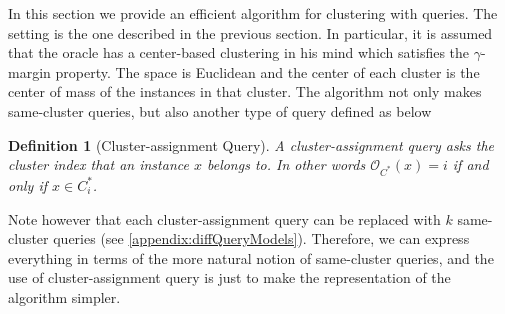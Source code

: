 \documentclass{article}
\newcommand{\mc}{\mathcal}
\newtheorem{definition}[theorem]{Definition}
\begin{document}
In this section we provide an efficient algorithm for clustering with queries. The setting is the one described in the previous section. In particular, it is assumed that the oracle has a center-based clustering in his mind which satisfies the $\gamma$-margin property. The space is Euclidean and the center of each cluster is the center of mass of the instances in that cluster. The algorithm not only makes same-cluster queries, but also another type of query defined as below%


\begin{definition}[Cluster-assignment Query]
A cluster-assignment query asks the cluster index that an instance $x$ belongs to. In other words ${\mc O_{C^*}}(x) = i$ if and only if $x \in C^*_i$.
\end{definition}

Note however that each cluster-assignment query can be replaced with $k$ same-cluster queries (see \ref{appendix:diffQueryModels}). Therefore, we can express everything in terms of the more natural notion of same-cluster queries, and the use of cluster-assignment query is just to make the representation of the algorithm simpler.






\end{document}
